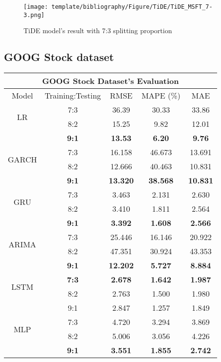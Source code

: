 \documentclass{ieeeojies}
\begin{document}
\begin{figure}[H]
  \centering
  \begin{minipage}{0.8\linewidth}
    \centering
    \texttt{[image: template/bibliography/Figure/TiDE/TiDE\_MSFT\_7-3.png]}
    \caption{TiDE model's result with 7:3 splitting proportion}
    \label{mbbbggg}
  \end{minipage}
\end{figure}
\subsection{GOOG Stock dataset} 
\begin{table}[H]
    \centering
    \begin{tabular}{|c|c|c|c|c|}
         \hline
         \multicolumn{5}{|c|}{\textbf{GOOG Stock Dataset's Evaluation}}\\
         \hline
         \centering Model & Training:Testing & RMSE & MAPE (\%) & MAE\\
         \hline
         \multirow{2}{*}{LR} & 7:3&36.39&30.33&33.86 \\ & 8:2 &  15.25 & 9.82 & 12.01 \\ & \textbf{9:1}&\textbf{13.53}&\textbf{6.20}&\textbf{9.76}\\
      \hline
         \multirow{2}{*}{GARCH} & 7:3&16.158&46.673&
13.691\\ & 8:2&12.666&40.463&10.831\\ & \textbf{9:1} & \textbf{13.320}& \textbf{38.568}& \textbf{10.831}\\
         \hline
         \multirow{2}{*}{GRU} & 7:3 & 3.463& 2.131& 2.630\\ &  8:2 & 3.410& 1.811& 2.564\\ & \textbf{9:1} &\textbf{3.392}& \textbf{1.608}& \textbf{2.566}\\
         \hline
         \multirow{2}{*}{ARIMA} & 7:3 & 25.446 & 16.146 & 20.922 \\ & 8:2 & 47.351 & 30.924 & 43.353 \\ & \textbf{9:1} & \textbf{12.202} & \textbf{5.727} & \textbf{8.884}\\
         \hline
         \multirow{2}{*}{LSTM} & \textbf{7:3} & \textbf{2.678} & \textbf{1.642} & \textbf{1.987} \\ &8:2 &2.763 & 1.500 & 1.980 \\ &  9:1 & 2.847& 1.257 & 1.849\\
         \hline
         \multirow{2}{*}{MLP} & 7:3 & 4.720 & 3.294 & 3.869\\ & 8:2 & 5.006	& 3.056 & 4.226\\ &\textbf{ 9:1 }& \textbf{3.551} & \textbf{1.855} & \textbf{2.742}\\

\end{tabular}
\end{table}
\end{document}
